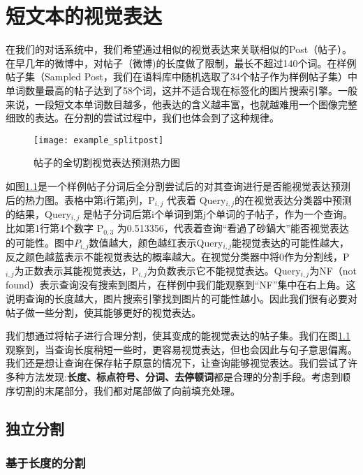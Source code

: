 \chapter{短文本的视觉表达}

在我们的对话系统中，我们希望通过相似的视觉表达来关联相似的Post（帖子）。在早几年的微博中，对帖子（微博)的长度做了限制，最长不超过140个词。在样例帖子集（Sampled Post，我们在语料库中随机选取了34个帖子作为样例帖子集）中单词数量最高的帖子达到了58个词，这并不适合现在标签化的图片搜索引擎。一般来说，一段短文本单词数目越多，他表达的含义越丰富，也就越难用一个图像完整细致的表达。在分割的尝试过程中，我们也体会到了这种规律。

\begin{figure}[ht]
\centering
\texttt{[image: example\_splitpost]}
\caption{帖子的全切割视觉表达预测热力图} \label{fig:example_splitpost}
\end{figure}

如图\ref{fig:example_splitpost}是一个样例帖子分词后全分割尝试后的对其查询进行是否能视觉表达预测后的热力图。表格中第i行第j列，P$_{i,j}$ 代表着 Query$_{i,j}$的在视觉表达分类器中预测的结果，Query$_{i,j}$ 是帖子分词后第i个单词到第j个单词的子帖子，作为一个查询。比如第1行第4个数字 P$_{0,3}$ 为0.513356，代表着查询“看過了砂鍋大”能否视觉表达的可能性。图中$P_{i,j}$数值越大，颜色越红表示Query$_{i,j}$能视觉表达的可能性越大，反之颜色越蓝表示不能视觉表达的概率越大。在视觉分类器中将0作为分割线，P$_{i,j}$为正数表示其能视觉表达，P$_{i,j}$为负数表示它不能视觉表达。Query$_{i,j}$为NF（not found）表示查询没有搜索到图片，在样例中我们能观察到“NF”集中在右上角。这说明查询的长度越大，图片搜索引擎找到图片的可能性越小。因此我们很有必要对帖子做一些分割，使其能够更好的视觉表达。

我们想通过将帖子进行合理分割，使其变成的能视觉表达的帖子集。我们在图\ref{fig:example_splitpost}观察到，当查询长度稍短一些时，更容易视觉表达，但也会因此与句子意思偏离。我们还是想让查询在保存帖子原意的情况下，让查询能够视觉表达。我们尝试了许多种方法发现:\textbf{长度、标点符号、分词、去停顿词}都是合理的分割手段。考虑到顺序切割的末尾部分，我们都对尾部做了向前填充处理。

\section{独立分割}

\subsection{基于长度的分割}

